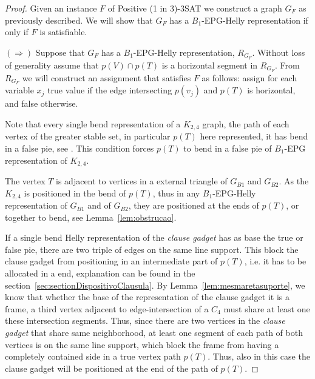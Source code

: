 \documentclass[a4paper,11pt]{article}
\begin{document}
\begin{proof}
Given an instance $F$ of {\sc Positive (1 in 3)-3SAT} we construct a graph $G_F$ as previously described. We will show that $G_F$ has a   $B_{1}$-EPG-Helly representation if only if $F$ is satisfiable.

$(\Rightarrow)$ Suppose that $G_F$ has a $B_1$-EPG-Helly representation, $R_{G_F}$. Without loss of generality assume that $p(V) \cap p(T)$ is a horizontal segment in  $R_{G_F}$. From $R_{G_F}$ we will construct an assignment that satisfies $F$ as follows: assign for each variable $ x_{j}$ true value if the edge intersecting $p(v_j)$ and $p(T)$ is horizontal, and false otherwise.

Note that every single bend representation of a $K_{2,4}$ graph, the path of each vertex of the greater stable set, in particular $p(T)$ here represented, it has bend in a false pie, see \citep{Asinowski2009}. This condition forces $p(T)$ to bend in a false pie of $B_1$-EPG representation of $K_{2,4}$. 

The vertex $T$ is adjacent to vertices in a external triangle of $G_{B1}$ and $G_{B2}$. As the $K_{2,4}$ is positioned in the bend of $p(T)$, thus in any $B_{1}$-EPG-Helly representation of $G_{B1}$  and of $G_{B2}$, they are positioned at the ends of $p(T)$, or together to bend, see Lemma~\ref{lem:obstrucao}.   

If a single bend Helly representation of the \textit{clause gadget} has as base the true or false pie, there are two triple of edges on the same line support. This block the clause gadget from positioning in an intermediate part of  $p(T)$, i.e. it has to be allocated in a end, explanation can be found in the section~\ref{sec:sectionDispositivoClausula}. By Lemma~\ref{lem:mesmaretasuporte}, we know that whether the base of the representation of the clause gadget it is a frame, a third vertex  adjacent to edge-intersection of a $C_4$ must share at least one these intersection segments. Thus, since there are two vertices in the \textit{clause gadget}  that share same neighborhood, at least one segment of each path of both vertices is on the same line support, which block the frame from having a completely contained side in a true vertex path $p(T)$. Thus, also in this case the clause gadget will be positioned at the end of the path of $p(T)$.


\end{proof}
\end{document}
